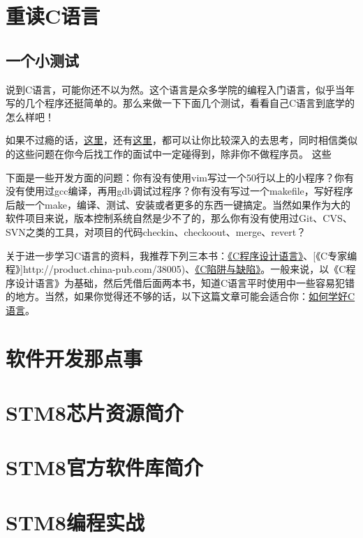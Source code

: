 \documentclass[a4paper]{book}
\makeatletter
\let\savedtitle=\@title
\renewcommand{\headrulewidth}{0pt}
\newcommand{\prechap}{第}
\newcommand{\postchap}{章}
\newcommand{\chap}[1]{\newpage\thispagestyle{empty}\chapter{#1}\label{chap:\thechapter}}
\renewcommand{\appendixname}{}
\makeatother
\begin{document}
\fancyhf{}
\fancyhead[LE]{\color{colorheader}\quad\small\textbf\thepage\quad\quad\small\leftmark}
\fancyhead[RO]{\color{colorheader}\small\rightmark\quad\quad\small\textbf\thepage\quad}

\pagestyle{fancy}

\mainmatter
\chap{重读C语言}

\section{一个小测试}

说到C语言，可能你还不以为然。这个语言是众多学院的编程入门语言，似乎当年写的几个程序还挺简单的。那么来做一下下面几个测试，看看自己C语言到底学的怎么样吧！

如果不过瘾的话，\href{http://coolshell.cn/articles/945.html}{这里}，还有\href{http://coolshell.cn/articles/873.html}{这里}，都可以让你比较深入的去思考，同时相信类似的这些问题在你今后找工作的面试中一定碰得到，除非你不做程序员。 这些

下面是一些开发方面的问题：你有没有使用vim写过一个50行以上的小程序？你有没有使用过gcc编译，再用gdb调试过程序？你有没有写过一个makefile，写好程序后敲一个make，编译、测试、安装或者更多的东西一键搞定。当然如果作为大的软件项目来说，版本控制系统自然是少不了的，那么你有没有使用过Git、CVS、SVN之类的工具，对项目的代码checkin、checkoout、merge、revert？

关于进一步学习C语言的资料，我推荐下列三本书：\href{http://product.china-pub.com/14975\&ref=browse}{《C程序设计语言》}、{[}《C专家编程》{]}http://product.china-pub.com/38005)、\href{http://product.china-pub.com/38125}{《C陷阱与缺陷》}。一般来说，以《C程序设计语言》为基础，然后凭借后面两本书，知道C语言平时使用中一些容易犯错的地方。当然，如果你觉得还不够的话，以下这篇文章可能会适合你：\href{http://coolshell.cn/articles/4102.html}{如何学好C语言}。

\chap{软件开发那点事}

\chap{STM8芯片资源简介}

\chap{STM8官方软件库简介}

\chap{STM8编程实战}



\appendices
\renewcommand{\prechap}{\appendixname}
\renewcommand{\postchap}{}
\end{document}
